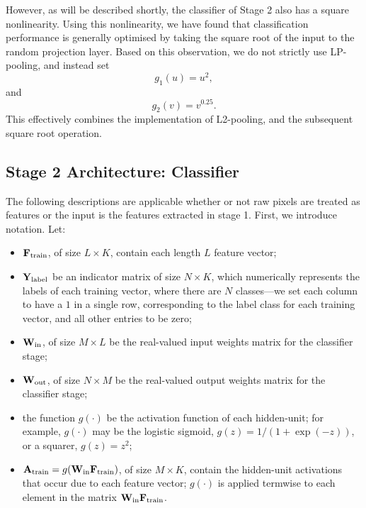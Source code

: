 \documentclass[conference]{IEEEtran}
\begin{document}
However, as will be described shortly, the classifier of Stage 2 also has a square nonlinearity. Using this nonlinearity, we have found that classification performance is generally optimised by taking the square root of the input to the random projection layer.  Based on this observation, we do not strictly use LP-pooling, and instead set 
\begin{equation}\label{g1_a}
g_1(u) = u^2,
\end{equation}
and
\begin{equation}\label{g2_a}
g_2(v) = v^{0.25}.
\end{equation}
This effectively combines the implementation of L2-pooling, and the subsequent square root operation.


\subsection{Stage 2 Architecture: Classifier}

The following descriptions are applicable whether or not  raw pixels are treated as features or the input is the features extracted in stage 1.
First, we introduce notation. Let:
\begin{itemize}
\item ${\bf F}_{\rm train}$, of size $L\times K$, contain each length $L$ feature vector;
\item ${\bf Y}_{\rm label}$ be an indicator matrix of size $N\times K$, which numerically represents the labels of each training vector, where there are $N$ classes---we set each column to have a $1$ in a single row, corresponding to the label class for each training vector, and all other entries to be zero;
\item ${\bf W}_{\rm in}$, of size $M\times L$ be the real-valued input weights matrix for the classifier stage;
\item ${\bf W}_{\rm out}$, of size $N\times M$ be the real-valued output weights matrix for the classifier stage;
\item the function $g(\cdot)$ be the activation function of each hidden-unit; for example, $g(\cdot)$ may be the logistic sigmoid, $g(z) = 1/(1+\exp(-z))$, or a squarer, $g(z)=z^2$;
\item ${\bf A}_{\rm train}=g({\bf W_{\rm in}}{\bf F_{\rm train}})$, of size $M\times K$, contain the hidden-unit activations that occur due to each feature vector; $g(\cdot)$ is applied termwise to each element in the matrix  ${\bf W_{\rm in}}{\bf F_{\rm train}}$.
\end{itemize}
\end{document}

